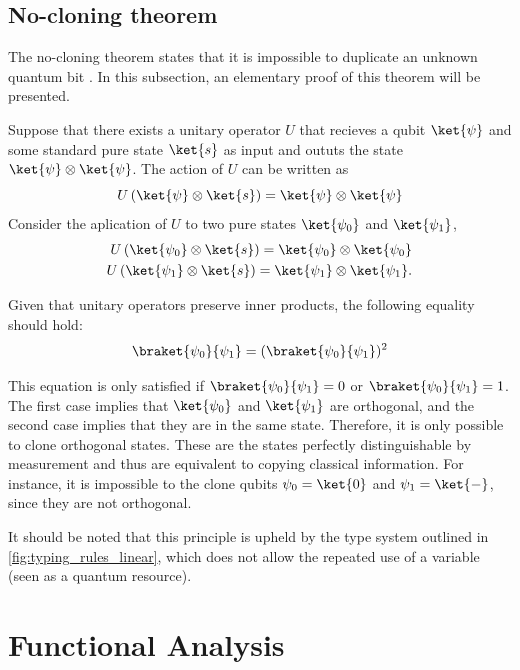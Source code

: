 \subsection{No-cloning theorem}
The no-cloning theorem states that it is impossible to duplicate an unknown quantum bit \cite{wootters1982single}. In this subsection, an elementary proof of this theorem will be presented.

Suppose that there exists a unitary operator $U$ that recieves a qubit $\ket{\psi}$ and some standard pure state $\ket{s}$ as input and oututs the state $\ket{\psi} \otimes \ket{\psi}$. The action of $U$ can be written as
\begin{equation*}
  U \left(\ket{\psi} \otimes \ket{s} \right) = \ket{\psi} \otimes \ket{\psi}
\end{equation*}
Consider the aplication of $U$ to two pure states $\ket{\psi_0}$ and $\ket{\psi_1}$,
\begin{align*}
  U \left(\ket{\psi_0} \otimes \ket{s} \right) = \ket{\psi_0} \otimes \ket{\psi_0} \\
  U \left(\ket{\psi_1} \otimes \ket{s} \right) = \ket{\psi_1} \otimes \ket{\psi_1}.
\end{align*}

Given that unitary operators preserve inner products, the following equality should hold:
\begin{equation*}
  \braket{\psi_0}{\psi_1} = ( \braket{\psi_0}{\psi_1})^{2}
\end{equation*}

This equation is only satisfied if $\braket{\psi_0}{\psi_1} = 0$ or $\braket{\psi_0}{\psi_1} = 1$. The first case implies that $\ket{\psi_0}$ and $\ket{\psi_1}$ are orthogonal, and the second case implies that they are in the same state. Therefore, it is only possible to clone orthogonal states. These are the states perfectly distinguishable by measurement and thus are equivalent to copying classical information. For instance, it is impossible to the clone qubits $\psi_0 = \ket{0}$ and $\psi_1 = \ket{-}$, since they are not orthogonal.

It should be noted that this principle is upheld by the type system outlined in \autoref{fig:typing_rules_linear}, which does not allow the repeated use of a variable (seen as a quantum resource).




\section{Functional Analysis}

